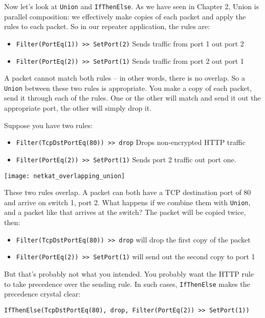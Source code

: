 Now let's look at \texttt{Union} and \texttt{IfThenElse}.  
As we have seen in Chapter 2, Union is parallel composition:
we effectively make copies of each packet and apply the rules to each packet.  So in our 
repeater application, the rules are:

\begin{itemize}
  \item \texttt{Filter(PortEq(1)) >> SetPort(2)} Sends traffic from port 1 out port 2 
  \item \texttt{Filter(PortEq(2)) >> SetPort(1)} Sends traffic from port 2 out port 1 
\end{itemize}

A packet cannot match both rules -- in other words, there is no overlap.  So a \texttt{Union} between
these two rules is appropriate.  You make a copy of each packet, send it through each of the rules.  
One or the other will match and send it out the appropriate port, the other will simply drop it.  

Suppose you have two rules:

\begin{itemize}
  \item \texttt{Filter(TcpDstPortEq(80)) >> drop} Drops non-encrypted HTTP traffic 
  \item \texttt{Filter(PortEq(2)) >> SetPort(1)} Sends port 2 traffic out port one.
\end{itemize}

\texttt{[image: netkat\_overlapping\_union]}

These two rules overlap.  A packet can both have a TCP destination port of 80 and
arrive on switch 1, port 2.  What happens if we combine them with \texttt{Union}, and a packet
like that arrives at the switch?  The packet will be copied twice, then:

\begin{itemize}
  \item \texttt{Filter(TcpDstPortEq(80)) >> drop} will drop the first copy of the packet 
  \item \texttt{Filter(PortEq(2)) >> SetPort(1)} will send out the second copy to port 1
\end{itemize}

But that's probably not what you intended.  You probably want the HTTP rule to take precedence over the
sending rule.  In such cases,
\texttt{IfThenElse} makes the precedence crystal clear:

\texttt{IfThenElse(TcpDstPortEq(80), drop, Filter(PortEq(2)) >> SetPort(1))}

